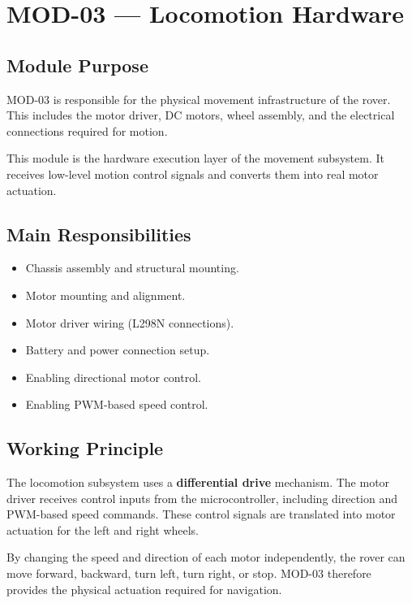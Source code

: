\documentclass[12pt,a4paper]{article}
\begin{document}
\newpage

\section{MOD-03 --- Locomotion Hardware}

\subsection{Module Purpose}

MOD-03 is responsible for the physical movement infrastructure of the rover. This
includes the motor driver, DC motors, wheel assembly, and the electrical connections
required for motion.

This module is the hardware execution layer of the movement subsystem. It receives
low-level motion control signals and converts them into real motor actuation.

\subsection{Main Responsibilities}

\begin{itemize}[leftmargin=1.5em]
  \item Chassis assembly and structural mounting.
  \item Motor mounting and alignment.
  \item Motor driver wiring (L298N connections).
  \item Battery and power connection setup.
  \item Enabling directional motor control.
  \item Enabling PWM-based speed control.
\end{itemize}

\subsection{Working Principle}

The locomotion subsystem uses a \textbf{differential drive} mechanism. The motor
driver receives control inputs from the microcontroller, including direction and
PWM-based speed commands. These control signals are translated into motor actuation
for the left and right wheels.

By changing the speed and direction of each motor independently, the rover can move
forward, backward, turn left, turn right, or stop. MOD-03 therefore provides the
physical actuation required for navigation.
\end{document}
